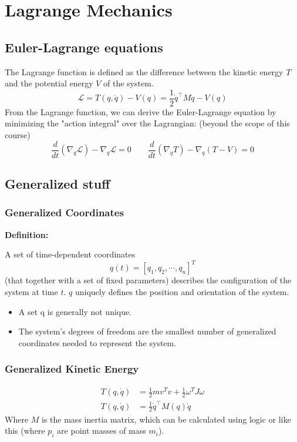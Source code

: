 \section{Lagrange Mechanics}
\subsection{Euler-Lagrange equations}
The Lagrange function is defined as the difference between the kinetic energy $T$ and the potential energy $V$ of the system.
$$
\mathcal{L}=T(q,\dot{q})-V(q)=\frac{1}{2}{\dot{q}}^\top M\dot{q}-V(q)
$$
From the Lagrange function, we can derive the Euler-Lagrange equation by minimizing the "action integral" over the Lagrangian: (beyond the scope of this course)
$$
\frac{d}{dt}(\nabla_{\dot{q}}\mathcal{L})-\nabla_q\mathcal{L}=0 \qquad
\frac{d}{dt}(\nabla_{\dot{q}}T)-\nabla_q(T-V)=0
$$

\subsection{Generalized stuff}
\subsubsection{Generalized Coordinates}
\textbf{Definition:}

A set of time-dependent coordinates 
$$q(t)=\left[q_1,q_2,\cdots,q_n\right]^T$$
(that together with a set of fixed parameters) describes the configuration of the system at time $t$.
$q$ uniquely defines the position and orientation of the system.
\begin{itemize}
    \item A set q is generally not unique.
    \item The system’s degrees of freedom are the smallest number of generalized coordinates needed to represent the system.
\end{itemize}

\subsubsection{Generalized Kinetic Energy}
\begin{equation*}
    \begin{split}
        T(q,\dot{q})&=\frac{1}{2}mv^Tv+\frac{1}{2}\omega^TJ\omega\\
        T(q,\dot{q})&=\frac{1}{2}{\dot{q}}^\top M(q)\dot{q}
    \end{split}
\end{equation*}
Where $M$ is the mass inertia matrix, which can be calculated using logic or like this (where $p_i$ are point masses of mass $m_i$).

